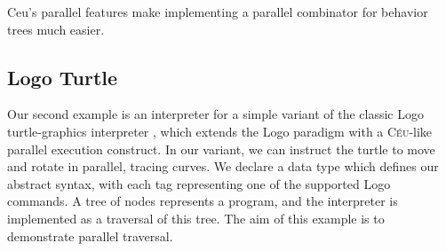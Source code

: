 \documentclass{acm_proc_article-sp}
\newcommand{\CEU}{\textsc{C\'{e}u}\xspace}
\begin{document}


Ceu's parallel features make implementing a parallel combinator for behavior 
trees much easier.

\subsection{Logo Turtle}

Our second example is an interpreter for a simple variant of the classic Logo
turtle-graphics interpreter \cite{papert.logo}, which extends the Logo
paradigm with a \CEU-like parallel execution construct. In our variant, we can
instruct the turtle to move and rotate in parallel, tracing curves. We declare
a data type which defines our abstract syntax, with each tag representing one
of the supported Logo commands. A tree of nodes represents a program, and the
interpreter is implemented as a traversal of this tree. The aim of this
example is to demonstrate parallel traversal.
\end{document}
